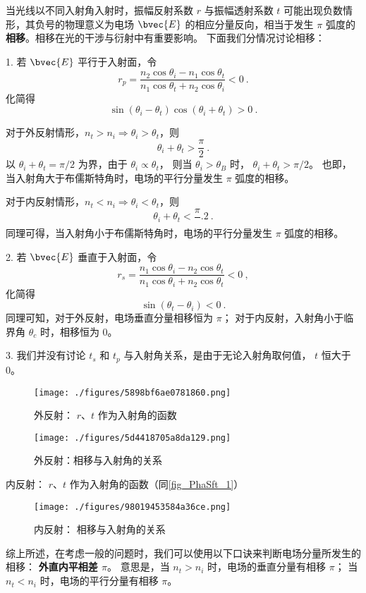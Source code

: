 
\begin{issues}
\issueMissDepend
\end{issues}


当光线以不同入射角入射时，振幅反射系数 $r$ 与振幅透射系数 $t$  可能出现负数情形，其负号的物理意义为电场 $\bvec{E}$ 的相应分量反向，相当于发生 $\pi$ 弧度的\textbf{相移}。相移在光的干涉与衍射中有重要影响。
下面我们分情况讨论相移：

1. 若 $\bvec{E}$ 平行于入射面，令
$$ r_p =  \dfrac{n_2\cos{\theta_i} - n_1\cos\theta_t}{n_1\cos\theta_t + n_2\cos\theta_i} < 0 ~.$$
化简得
$$ \sin(\theta_i - \theta_t)\cos(\theta_i + \theta_t) > 0~.$$

对于外反射情形，$n_t > n_i \Rightarrow \theta_i > \theta_t$，则
$$\theta_i + \theta_t > \frac{\pi}{2}~.$$
以 $\theta_i + \theta_t = \pi/2$ 为界，由于 $\theta_i \propto \theta_t$， 则当 $\theta_i > \theta_B$ 时， $\theta_i + \theta_t > \pi/2$。 也即，当入射角大于布儒斯特角时，电场的平行分量发生 $\pi$ 弧度的相移。

对于内反射情形，$ n_t < n_i \Rightarrow \theta_i < \theta_t$，则
$$\theta_i + \theta_t < \frac{\pi}~.{2}~.$$
同理可得，当入射角小于布儒斯特角时，电场的平行分量发生 $\pi$ 弧度的相移。

2. 若 $\bvec{E}$ 垂直于入射面，令
$$r_s  = \frac{n_1\cos{\theta_i} - n_2\cos\theta_t}{n_1\cos\theta_i + n_2\cos\theta_t} < 0~,$$
化简得
$$\sin(\theta_t - \theta_i) < 0~.$$
同理可知，对于外反射，电场垂直分量相移恒为 $\pi$； 对于内反射，入射角小于临界角 $\theta_c$ 时，相移恒为 0。

3. 我们并没有讨论 $t_s$ 和 $t_p$ 与入射角关系，是由于无论入射角取何值， $ t$ 恒大于0。

\begin{figure}[ht]
\centering
\texttt{[image: ./figures/5898bf6ae0781860.png]}
\caption{外反射： $r$、$t$ 作为入射角的函数} \label{fig_PhaSft_1}
\end{figure}

\begin{figure}[ht]
\centering
\texttt{[image: ./figures/5d4418705a8da129.png]}
\caption{外反射：相移与入射角的关系} \label{fig_PhaSft_4}
\end{figure}

内反射：  $r$、$t$ 作为入射角的函数（同\autoref{fig_PhaSft_1}）

\begin{figure}[ht]
\centering
\texttt{[image: ./figures/98019453584a36ce.png]}
\caption{内反射： 相移与入射角的关系} \label{fig_PhaSft_2}
\end{figure}

综上所述，在考虑一般的问题时，我们可以使用以下口诀来判断电场分量所发生的相移： 
\textbf{外直内平相差 $\pi$}。
意思是，当 $n_t > n_i$ 时，电场的垂直分量有相移 $\pi$； 当 $n_t < n_i$ 时，电场的平行分量有相移 $\pi$。
